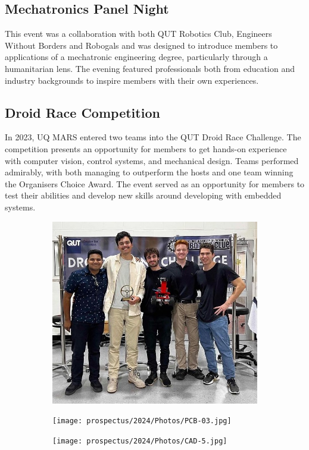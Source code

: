 \documentclass[a4paper,12pt]{report}
\begin{document}
\vspace{-2cm}

\subsection{Mechatronics Panel Night}
This event was a collaboration with both QUT Robotics Club, Engineers Without Borders and Robogals and was designed to introduce members to applications of a mechatronic engineering degree, particularly through a humanitarian lens.
The evening featured professionals both from education and industry backgrounds to inspire members with their own experiences.

\vspace{-1.8cm}

\subsection{Droid Race Competition}
In 2023, UQ MARS entered two teams into the QUT Droid Race Challenge.
The competition presents an opportunity for members to get hands-on experience with computer vision, control systems, and mechanical design.
Teams performed admirably, with both managing to outperform the hosts and one team winning the Organisers Choice Award.
The event served as an opportunity for members to test their abilities and develop new skills around developing with embedded systems. 
\begin{figure}[H]
    \centering
    \begin{subfigure}{0.32\linewidth}
        \includegraphics[width=0.99\linewidth]{prospectus/2024/Photos/DRC_EXECTEAM.jpg}
    \end{subfigure}
    \begin{subfigure}{0.32\linewidth}
        \texttt{[image: prospectus/2024/Photos/PCB-03.jpg]}
    \end{subfigure}
    \begin{subfigure}{0.32\linewidth}
        \texttt{[image: prospectus/2024/Photos/CAD-5.jpg]}
    \end{subfigure}
\end{figure}
\end{document}
